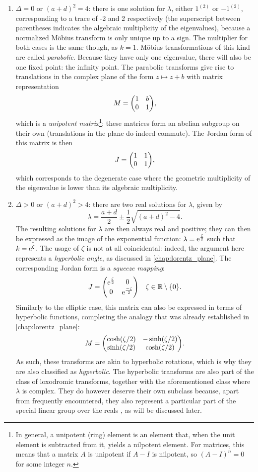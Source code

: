 \begin{enumerate}
\begin{enumerate}
        \end{enumerate}
    \item \(\Delta = 0\) or \((a + d)^2 = 4\): there is one solution for \(\lambda\), either \(1^{(2)}\) or \(-1^{(2)}\), corresponding to a trace of -2 and 2 respectively (the superscript between parentheses indicates the algebraic multiplicity of the eigenvalues), because a normalized Möbius transform is only unique up to a sign. The multiplier for both cases is the same though, as \(k = 1\). Möbius transformations of this kind are called \emph{parabolic}. Because they have only one eigenvalue, there will also be one fixed point: the infinity point. The parabolic transforms give rise to translations in the complex plane of the form \(z \mapsto z + b\) with matrix representation
    \[ M = \mqty(1 & b \\ 0 & 1 ), \]
    which is a \emph{unipotent matrix}\footnote{In general, a unipotent (ring) element is an element that, when the unit element is subtracted from it, yields a nilpotent element. For matrices, this means that a matrix \(A\) is unipotent if \(A - I\) is nilpotent, so \((A - I)^n = 0\) for some integer \(n\).}; these matrices form an abelian subgroup on their own (translations in the plane do indeed commute). The Jordan form of this matrix is then
    \[ J = \mqty( 1 & 1 \\ 0 & 1 ), \]
    which corresponds to the degenerate case where the geometric multiplicity of the eigenvalue is lower than its algebraic multiplicity.
    \item \(\Delta > 0\) or \((a + d)^2 > 4\): there are two real solutions for \(\lambda\), given by
        \[ \lambda = \frac{a + d}{2} \pm \frac{1}{2}\sqrt{(a + d)^2 - 4}. \]
        The resulting solutions for \(\lambda\) are then always real and positive; they can then be expressed as the image of the exponential function: \(\lambda = \mathrm{e}^{\frac{\zeta}{2}}\) such that \(k = \mathrm{e}^{\zeta}\). The usage of \(\zeta\) is not at all coincidental: indeed, the argument here represents a \emph{hyperbolic angle}, as discussed in \cref{chap:lorentz_plane}. The corresponding Jordan form is a 
        \emph{squeeze mapping}:
        \[ J = \mqty(\dmat[0]{\ec^{\frac{\zeta}{2}}, \ec^{\frac{-\zeta}{2}}})
        \quad \zeta \in \real\setminus\qty{0}. \]
        Similarly to the elliptic case, this matrix can also be expressed in terms of hyperbolic functions, completing the analogy that was already established in \cref{chap:lorentz_plane}:
        \[ M = \mqty(\cosh(\zeta/2) & -\sinh(\zeta/2)\\ 
                     \sinh(\zeta/2) & \cosh(\zeta/2)). \]
        As such, these transforms are akin to hyperbolic rotations, which is why they are also classified as \emph{hyperbolic}. The hyperbolic transforms are also part of the class of loxodromic transforms, together with the aforementioned class where \(\lambda\) is complex. They do however deserve their own subclass because, apart from frequently encountered, they also represent a particular part of the special linear group over the reals , as will be discussed later.
\end{enumerate}
